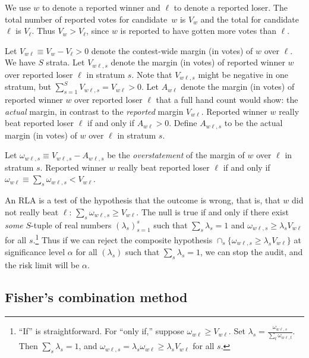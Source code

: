 \documentclass[runningheads]{llncs}
\begin{document}
We use $w$ to denote a reported winner and $\ell$ to denote a reported loser.
The total number of reported votes for candidate~$w$ is $V_w$ 
and the total for candidate~$\ell$ is $V_\ell$.
Thus $V_w > V_\ell$, since $w$ is reported to have gotten more votes than $\ell$.

Let $V_{w\ell} \equiv V_w - V_\ell > 0$ denote the contest-wide margin (in votes) of 
$w$ over  $\ell$.
We have $S$ strata.
Let $V_{w\ell,s}$ denote the margin (in votes) of reported winner $w$ over reported loser $\ell$
in stratum $s$. 
Note that $V_{w\ell,s}$ might be negative in one stratum, but $\sum_{s=1}^S V_{w\ell,s} = V_{w\ell} > 0$.
Let $A_{w\ell}$ denote the margin (in votes) of reported winner $w$ over reported loser $\ell$ that  a full hand count would show: the \emph{actual} margin, in contrast to the \emph{reported} margin $V_{w\ell}$.
Reported winner $w$ really beat reported loser $\ell$ if and only if $A_{w\ell} > 0$.
Define $A_{w\ell,s}$ to be the actual margin (in votes) of $w$ over $\ell$ in stratum $s$.

Let $\omega_{w\ell,s} \equiv V_{w\ell,s} - A_{w\ell,s}$ be the \emph{overstatement}
of the margin of $w$ over $\ell$ in stratum $s$.
Reported winner $w$ really beat reported loser 
$\ell$ if and only if $\omega_{w\ell} \equiv \sum_s \omega_{w\ell,s} < V_{w\ell}$.

An RLA is a test of the hypothesis that the outcome is wrong, that is, that $w$ did not really beat $\ell$:
$\sum_s \omega_{w\ell, s} \ge V_{w\ell}$.
The null is true if and only if there exist \textit{some} $S$-tuple of real numbers $(\lambda_s)_{s=1}^s$ such that $\sum_s \lambda_s = 1$ and $\omega_{w\ell, s} \ge \lambda_s V_{w\ell}$ for all $s$.\footnote{%
  ``If'' is straightforward. For ``only if,'' suppose $\omega_{w\ell} \ge V_{w\ell}$. Set $\lambda_s = \frac{\omega_{w\ell, s}}{\sum_t \omega_{w\ell, t}}$. Then $\sum_s \lambda_s = 1$, and $\omega_{w\ell, s} = \lambda_s \omega_{w\ell} \ge \lambda_s V_{w\ell}$ for all $s$.
}
Thus if we can reject the composite hypothesis $\cap_s \{ \omega_{w\ell,s} \ge \lambda_s V_{w\ell} \}$ at significance level $\alpha$ for all $(\lambda_s)$ such that $\sum_s \lambda_s = 1$, we can stop the audit, and the risk limit will be $\alpha$.

\subsection{Fisher's combination method}
\end{document}
